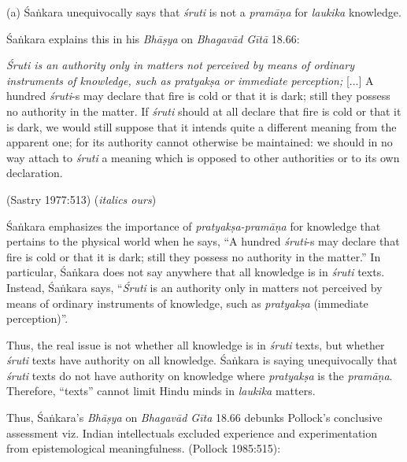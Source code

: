 (a) Śaṅkara unequivocally says that {{\sl śruti}\relax} is not a {{\sl pramāṇa}\relax} for {{\sl laukika}\relax} knowledge.

Śaṅkara explains this in his {\sl Bhāṣya} on {\sl Bhagavād Gītā} 18.66:
\begin{myquote}
{\textsl{Śruti is an authority only in matters not perceived by means of ordinary instruments of knowledge, such as pratyakṣa or immediate perception;}} [...] A hundred {\sl śruti}-s may declare that fire is cold or that it is dark; still they possess no authority in the matter. If {\sl śruti} should at all declare that fire is cold or that it is dark, we would still suppose that it intends quite a different meaning from the apparent one; for its authority cannot otherwise be maintained: we should in no way attach to {\sl śruti} a meaning which is opposed to other authorities or to its own declaration.

\hfill (Sastry 1977:513) ({\sl italics ours})
\end{myquote}

Śaṅkara emphasizes the importance of {\sl pratyakṣa-pramāṇa} for knowledge that pertains to the physical world when he says, ``A hundred {\sl śruti}-s may declare that fire is cold or that it is dark; still they possess no authority in the matter.''  In particular, Śaṅkara does not say anywhere that all knowledge is in {\sl śruti} texts. Instead, Śaṅkara says, ``{\sl Śruti} is an authority only in matters not perceived by means of ordinary instruments of knowledge, such as {\sl pratyakṣa} (immediate perception)''. 

Thus, the real issue is not whether all knowledge is in {\sl śruti} texts, but whether {\sl śruti} texts have authority on all knowledge.  Śaṅkara is saying unequivocally that {\sl śruti} texts do not have authority on knowledge where {\sl pratyakṣa} is the {\sl pramāṇa}. Therefore, ``texts'' cannot limit Hindu minds in {\sl laukika} matters.

Thus, Śaṅkara's {\sl Bhāṣya} on {\sl Bhagavād Gīta} 18.66 debunks Pollock's conclusive assessment viz. Indian intellectuals excluded experience and experimentation from epistemological meaningfulness. (Pollock 1985:515):

